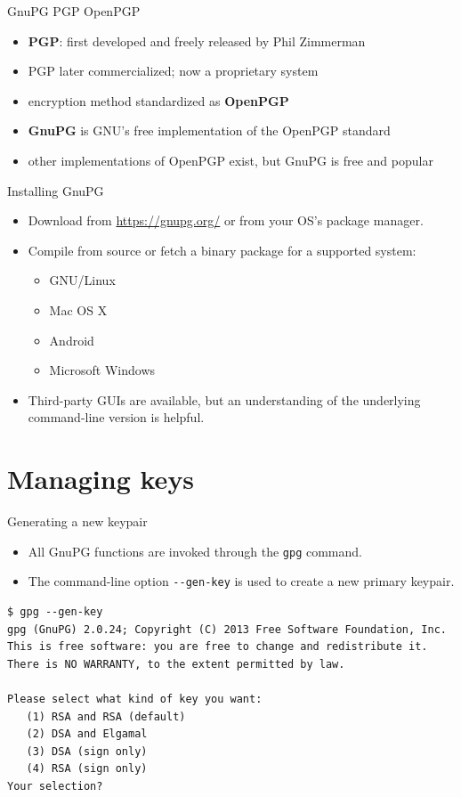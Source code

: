 \documentclass[%
mode=present,%
paper=smartboard,
size=20pt,
]{powerdot}
\newcommand{\clopt}[1]{\texttt{{-}#1}}
\begin{document}
\begin{slide}{GnuPG \vs PGP \vs OpenPGP}
  \begin{itemize}
  \item \textbf{PGP}: first developed and freely released by Phil Zimmerman
  \item PGP later commercialized; now a proprietary system
  \item encryption method standardized as \textbf{OpenPGP}
  \item \textbf{GnuPG} is GNU's free implementation of the OpenPGP standard
  \item other implementations of OpenPGP exist, but GnuPG is free and
    popular
  \end{itemize}
\end{slide}

\begin{slide}{Installing GnuPG}
  \begin{itemize}
  \item Download from \url{https://gnupg.org/} or from your OS's package manager.
  \item Compile from source or fetch a binary package for a supported
    system:
    \begin{itemize}
    \item GNU/Linux
    \item Mac OS X
    \item Android
    \item Microsoft Windows
    \end{itemize}
  \item Third-party GUIs are available, but an understanding of the underlying
    command-line version is helpful.
  \end{itemize}
\end{slide}

\section{Managing keys}

\begin{slide}[method=direct]{Generating a new keypair}
  \begin{itemize}
  \item All GnuPG functions are invoked through the \texttt{gpg} command.
  \item The command-line option \clopt{-gen-key} is used to create a new
  primary keypair.
  \end{itemize}
\begin{verbatim}
$ gpg --gen-key
gpg (GnuPG) 2.0.24; Copyright (C) 2013 Free Software Foundation, Inc.
This is free software: you are free to change and redistribute it.
There is NO WARRANTY, to the extent permitted by law.

Please select what kind of key you want:
   (1) RSA and RSA (default)
   (2) DSA and Elgamal
   (3) DSA (sign only)
   (4) RSA (sign only)
Your selection?
\end{verbatim}
\end{slide}
\end{document}
